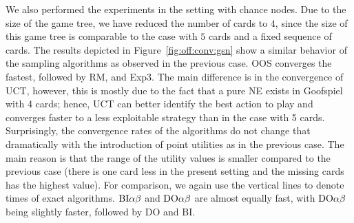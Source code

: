 {We also performed the experiments in the setting with chance nodes.
Due to the size of the game tree, we have reduced the number of cards to $4$, since the size of this game tree is comparable to the case with $5$ cards and a fixed sequence of cards.
The results depicted in Figure~\ref{fig:off:conv:gsn} show a similar behavior of the sampling algorithms as observed in the previous case.
OOS converges the fastest, followed by RM, and Exp3.
The main difference is in the convergence of UCT, however, this is mostly due to the fact that a pure NE exists in Goofspiel with 4 cards; hence, UCT can better
identify the best action to play and converges faster to a less exploitable strategy than in the case with 5 cards.
Surprisingly, the convergence rates of the algorithms do not change that dramatically with the introduction of point utilities as in the previous case.
The main reason is that the range of the utility values is smaller compared to the previous case (there is one card less in the present setting and the missing cards has the highest value).
For comparison, we again use the vertical lines to denote times of exact algorithms.
$\textrm{BI}\alpha\beta$ and $\textrm{DO}\alpha\beta$ are almost equally fast, with $\textrm{DO}\alpha\beta$ being slightly faster, followed by \textsc{DO} and \textsc{BI}.
}

